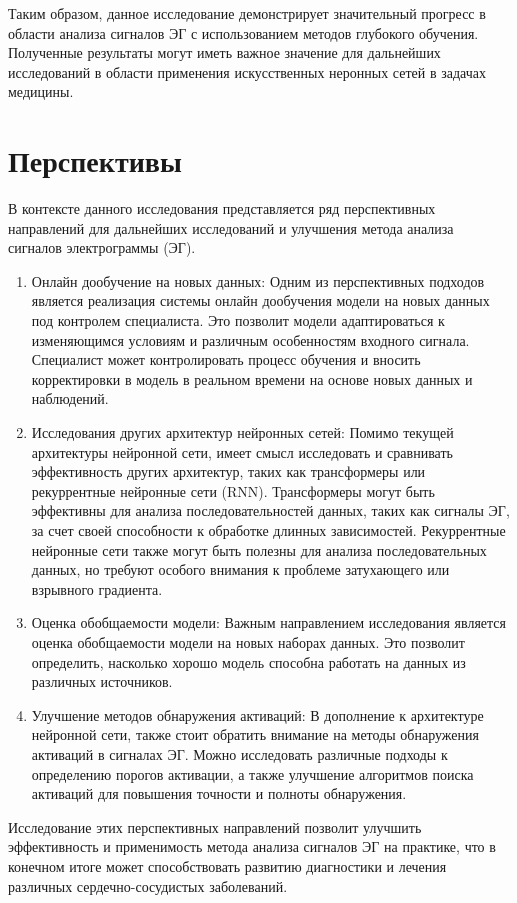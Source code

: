 Таким образом, данное исследование демонстрирует значительный прогресс в
области анализа сигналов ЭГ с использованием методов глубокого обучения.
Полученные результаты могут иметь важное значение для дальнейших исследований в
области применения искусственных неронных сетей в задачах медицины.

\section{Перспективы}

В контексте данного исследования представляется ряд перспективных направлений
для дальнейших исследований и улучшения метода анализа сигналов
электрограммы (ЭГ).

\begin{enumerate}

    \item Онлайн дообучение на новых данных: Одним из перспективных подходов
    является реализация системы онлайн дообучения модели на новых данных под
    контролем специалиста. Это позволит модели адаптироваться к изменяющимся
    условиям и различным особенностям входного сигнала. Специалист может
    контролировать процесс обучения и вносить корректировки в модель в реальном
    времени на основе новых данных и наблюдений.

    \item Исследования других архитектур нейронных сетей: Помимо текущей
    архитектуры нейронной сети, имеет смысл исследовать и сравнивать
    эффективность других архитектур, таких как трансформеры или рекуррентные
    нейронные сети (RNN). Трансформеры могут быть эффективны для анализа
    последовательностей данных, таких как сигналы ЭГ, за счет своей
    способности к обработке длинных зависимостей. Рекуррентные нейронные сети
    также могут быть полезны для анализа последовательных данных, но требуют
    особого внимания к проблеме затухающего или взрывного градиента.

    \item Оценка обобщаемости модели: Важным направлением исследования является
    оценка обобщаемости модели на новых наборах данных. Это позволит
    определить, насколько хорошо модель способна работать на данных из
    различных источников.

    \item Улучшение методов обнаружения активаций: В дополнение к архитектуре
    нейронной сети, также стоит обратить внимание на методы обнаружения
    активаций в сигналах ЭГ. Можно исследовать различные подходы к определению
    порогов активации, а также улучшение алгоритмов поиска активаций для
    повышения точности и полноты обнаружения.

\end{enumerate}

Исследование этих перспективных направлений позволит улучшить эффективность и
применимость метода анализа сигналов ЭГ на практике, что в конечном итоге может
способствовать развитию диагностики и лечения различных сердечно-сосудистых
заболеваний.
